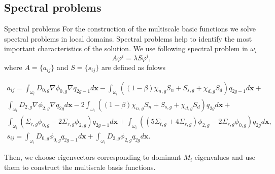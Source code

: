 \documentclass[10pt,pdf,hyperref={unicode}]{beamer}
\begin{document}
\subsection{Spectral problems}
	\begin{frame}{Spectral problems}
		For the construction of the multiscale basic functions we solve spectral problems in local domains. 
		Spectral problems help to identify the most important characteristics of the solution.
		We use following spectral problem in $\omega_i$
		\[
			A \varphi^i = \lambda S \varphi^i,
		\]
		where $A= \{ a_{ij} \}$ and $S = \{ s_{ij} \}$ are defined as folows
		\begin{footnotesize}
			\[
			\begin{split}
				a_{ij} = 
				\int_{\omega_i} D_{0,g} \nabla \phi_{0,g} \nabla q_{2g-1} d\bm x - 
				\int_{\omega_i} ((1-\beta) \chi_{n,g} S_{n} +  S_{s,g} + \chi_{d,g} S_d ) q_{2g-1} d\bm{x} + \\
				\int_{\omega_i} D_{2,g} \nabla \phi_{2,g} \nabla  q_{2g} d\bm{x} 
				-2 \int_{\omega_i} ((1-\beta) \chi_{n,g} S_{n} + S_{s,g} + \chi_{d,g} S_d) q_{2g} d\bm{x} + \\
				\int_{\omega_i} (\Sigma_{r,g} \phi_{0,g} - 2\Sigma_{r,g} \phi_{2,g} ) q_{2g-1} d\bm x +
				\int_{\omega_i} ((5 \Sigma_{t,g} + 4 \Sigma_{r,g}) \phi_{2,g} - 2\Sigma_{r,g} \phi_{0,g}) q_{2g} d\bm{x}, \\	
				s_{ij} = 
				\int_{\omega _i} D_{0,g} \phi_{0,g} q_{2g-1} d\bm x +
				\int_{\omega _i} D_{2,g} \phi_{2,g} q_{2g} d\bm x.
			\end{split}
			\]					
		\end{footnotesize}
		
		Then, we choose eigenvectors corresponding to dominant $M_{i}$ eigenvalues and use them to construct the multiscale basis functions.
	\end{frame}
\end{document}
